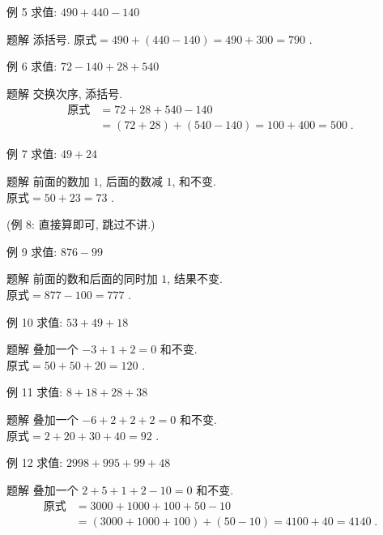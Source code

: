 \documentclass[content.tex]{subfiles}
\begin{document}
\begin{frame}{例 5}
求值: $490+440-140$
\begin{exampleblock}{题解}
添括号. $\text{原式} = 490 + (440 - 140) = 490+300 = 790$ .
\end{exampleblock}
\end{frame}

\begin{frame}{例 6}
求值: $72-140+28+540$
\begin{exampleblock}{题解}
交换次序, 添括号. 
\begin{align*}
\text{原式} &= 72+28+540-140 \\
&= (72+28) + (540-140) = 100 + 400 = 500\;.
\end{align*}
\end{exampleblock}
\end{frame}

\begin{frame}{例 7}
求值: $49+24$
\begin{exampleblock}{题解}
前面的数加 $1$, 后面的数减 $1$, 和不变. \\
$\text{原式} = 50 + 23 = 73$ .
\end{exampleblock}
\bigbreak
\centering (例 8: 直接算即可, 跳过不讲.)
\end{frame}

\begin{frame}{例 9}
求值: $876-99$
\begin{exampleblock}{题解}
前面的数和后面的同时加 $1$, 结果不变. \\
$\text{原式} = 877 - 100 = 777$ .
\end{exampleblock}
\end{frame}

\begin{frame}{例 10}
求值: $53+49+18$
\begin{exampleblock}{题解}
叠加一个 $-3+1+2=0$ 和不变. \\
$\text{原式} = 50+50+20 = 120$ .
\end{exampleblock}
\end{frame}

\begin{frame}{例 11}
求值: $8+18+28+38$
\begin{exampleblock}{题解}
叠加一个 $-6+2+2+2=0$ 和不变. \\
$\text{原式} = 2+20+30+40 = 92$ .
\end{exampleblock}
\end{frame}

\begin{frame}{例 12}
求值: $2998+995+99+48$
\begin{exampleblock}{题解}
叠加一个 $2+5+1+2-10=0$ 和不变.
\begin{align*}
\text{原式} &= 3000+1000+100+50-10 \\
&= (3000+1000+100) + (50-10) = 4100 + 40 = 4140\;.
\end{align*}
\end{exampleblock}
\end{frame}
\end{document}
